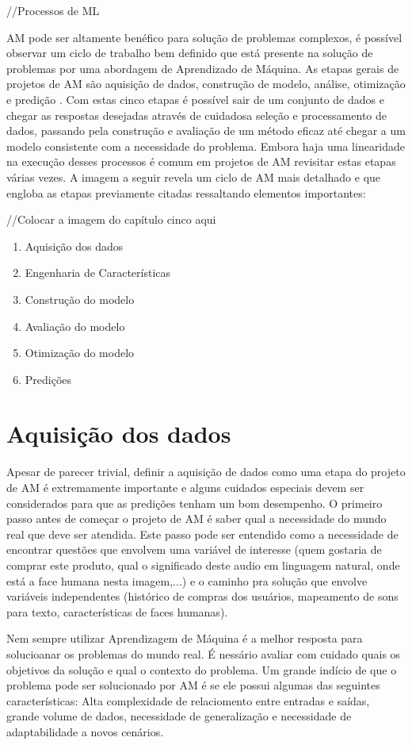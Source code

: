 //Processos de ML

AM pode ser altamente benéfico para solução de problemas complexos, é possível observar um ciclo de trabalho bem definido que está presente na solução de problemas por uma abordagem de Aprendizado de Máquina. As etapas gerais de projetos de AM são aquisição de dados, construção de modelo, análise, otimização e predição \cite{real2013}. Com estas cinco etapas é possível sair de um conjunto de dados e chegar as respostas desejadas através de cuidadosa seleção e processamento de dados, passando pela construção e avaliação de um método eficaz até chegar a um modelo consistente com a necessidade do problema. Embora haja uma linearidade na execução desses processos é comum em projetos de AM revisitar estas etapas várias vezes. A imagem a seguir revela um ciclo de AM mais detalhado e que engloba as etapas previamente citadas ressaltando elementos importantes: 

//Colocar a imagem do capítulo cinco aqui

\begin{enumerate}
\item Aquisição dos dados
\item Engenharia de Características
\item Construção do modelo
\item Avaliação do modelo
\item Otimização do modelo
\item Predições
\end{enumerate}

\section{Aquisição dos dados}
Apesar de parecer trivial, definir a aquisição de dados como uma etapa do projeto de AM é extremamente importante e alguns cuidados especiais devem ser considerados para que as predições tenham um bom desempenho. O primeiro passo antes de começar o projeto de AM é saber qual a necessidade do mundo real que deve ser atendida. Este passo pode ser entendido como a necessidade de encontrar questões que envolvem uma variável de interesse (quem gostaria de comprar este produto, qual o significado deste audio em linguagem natural, onde está a face humana nesta imagem,...) e o caminho pra solução que envolve variáveis independentes (histórico de compras dos usuários, mapeamento de sons para texto, características de faces humanas).

Nem sempre utilizar Aprendizagem de Máquina é a melhor resposta para solucioanar os problemas do mundo real. É nessário avaliar com cuidado quais os objetivos da solução e qual o contexto do problema. Um grande indício de que o problema pode ser solucionado por AM é se ele possui algumas das seguintes características: Alta complexidade de relaciomento entre entradas e saídas, grande volume de dados, necessidade de generalização e necessidade de adaptabilidade a novos cenários. 

